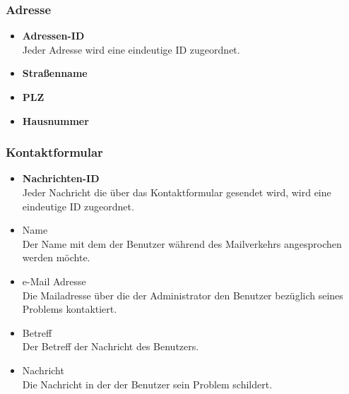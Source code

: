 \subsubsection*{Adresse}
	\begin{itemize}
	    \item \textbf{Adressen-ID}\hfill\\
	    Jeder Adresse wird eine eindeutige ID zugeordnet.
		\item \textbf{Straßenname}\hfill\\
		\item \textbf{PLZ} \hfill\\		
		\item \textbf{Hausnummer}\hfill\\
	\end{itemize}
\subsubsection*{Kontaktformular}
	\begin{itemize}
	    \item \textbf{Nachrichten-ID}\hfill\\
	    Jeder Nachricht die über das Kontaktformular gesendet wird, wird eine eindeutige ID zugeordnet.
		\item Name \hfill \\
		Der Name mit dem der Benutzer während des Mailverkehrs angesprochen werden möchte.
		\item e-Mail Adresse \hfill \\
		Die Mailadresse über die der Administrator den Benutzer bezüglich seines Problems kontaktiert. 
		\item Betreff \hfill \\
		Der Betreff der Nachricht des Benutzers.
		\item Nachricht \hfill \\
		Die Nachricht in der der Benutzer sein Problem schildert.
	\end{itemize}	
	
